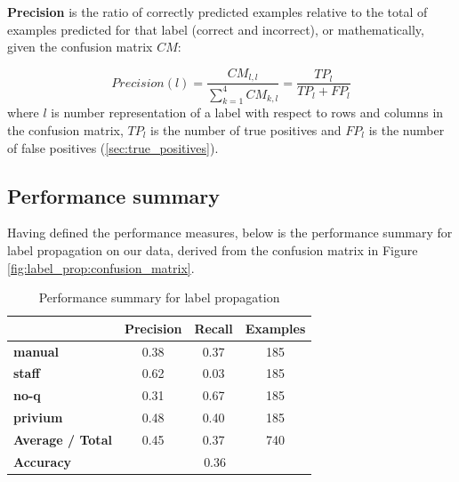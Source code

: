 \medskip
\par
\textbf{Precision} is the ratio of correctly predicted examples relative to the total of examples predicted for that label (correct and incorrect), or mathematically, given the confusion matrix $CM$:

\begin{equation*}
    Precision(l) = \frac{CM_{l,l}}{\sum\limits_{k=1}^{4} CM_{k,l}} = \frac{TP_l}{TP_l + FP_l}
\end{equation*}
where $l$ is number representation of a label with respect to rows and columns in the confusion matrix, $TP_l$ is the number of true positives and $FP_l$ is the number of false positives (\cref{sec:true_positives}). 

\subsection{Performance summary}
Having defined the performance measures, below is the performance summary for label propagation on our data, derived from the confusion matrix in Figure \ref{fig:label_prop:confusion_matrix}. 
\begin{table}[H]
    \centering 
    \begin{tabular}{c|c|c|c|}
        \cline{2-4}
                                                     & \textbf{Precision} & \textbf{Recall} & \textbf{Examples} \\ \hline
        \multicolumn{1}{|l|}{\textbf{manual}}        & 0.38               & 0.37            & 185               \\ \hline
        \multicolumn{1}{|l|}{\textbf{staff}}         & 0.62               & 0.03            & 185               \\ \hline
        \multicolumn{1}{|l|}{\textbf{no-q}}          & 0.31               & 0.67            & 185               \\ \hline
        \multicolumn{1}{|l|}{\textbf{privium}}       & 0.48               & 0.40            & 185               \\ 
        \hline \hline
        \multicolumn{1}{|l|}{\textbf{Average / Total}} & 0.45               & 0.37            & 740               \\ 
        \hline \hline
        \multicolumn{1}{|l|}{\textbf{Accuracy}}      & \multicolumn{3}{c|}{0.36}                                \\ \hline
    \end{tabular}   
    \caption{Performance summary for label propagation}
\end{table}
